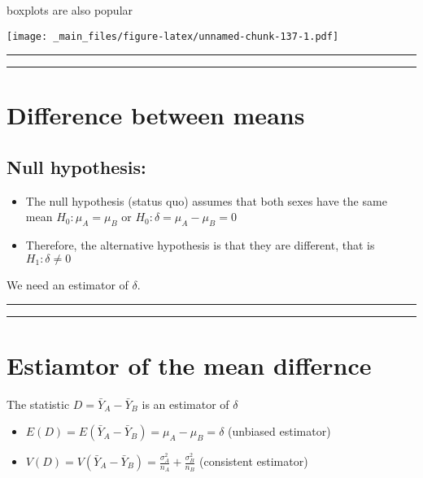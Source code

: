 \documentclass[
]{book}
\begin{document}
boxplots are also popular

\texttt{[image: \_main\_files/figure-latex/unnamed-chunk-137-1.pdf]}

\begin{center}\rule{0.5\linewidth}{0.5pt}\end{center}

\begin{center}\rule{0.5\linewidth}{0.5pt}\end{center}

\hypertarget{difference-between-means-4}{%
\section{Difference between means}\label{difference-between-means-4}}

\hypertarget{null-hypothesis-4}{%
\subsection{Null hypothesis:}\label{null-hypothesis-4}}

\begin{itemize}
\item
  The null hypothesis (status quo) assumes that both sexes have the same mean \(H_0: \mu_A=\mu_B\) or \(H_0: \delta=\mu_A-\mu_B=0\)
\item
  Therefore, the alternative hypothesis is that they are different, that is \(H_1: \delta \neq 0\)
\end{itemize}

We need an estimator of \(\delta\).

\begin{center}\rule{0.5\linewidth}{0.5pt}\end{center}

\begin{center}\rule{0.5\linewidth}{0.5pt}\end{center}

\hypertarget{estiamtor-of-the-mean-differnce}{%
\section{Estiamtor of the mean differnce}\label{estiamtor-of-the-mean-differnce}}

The statistic \(D=\bar{Y}_A-\bar{Y}_B\) is an estimator of \(\delta\)

\begin{itemize}
\item
  \(E(D)=E(\bar{Y}_A-\bar{Y}_B)=\mu_A-\mu_B=\delta\) (unbiased estimator)
\item
  \(V(D)=V(\bar{Y}_A-\bar{Y}_B)=\frac{\sigma^2_A}{n_A}+\frac{\sigma^2_B}{n_B}\) (consistent estimator)
\end{itemize}
\end{document}

